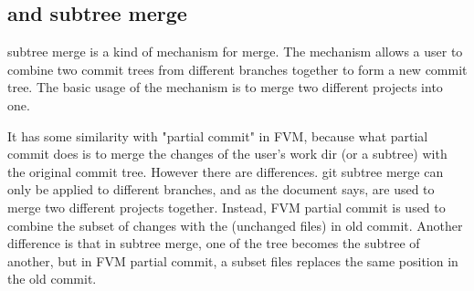 \subsection{\Sys and \git subtree merge}

\Git subtree merge is a kind of mechanism for \git merge.
\cite{git-subtree-merge}
The mechanism allows a user to combine two
commit trees from different branches together to form a new commit tree.
The basic usage of the mechanism is to merge two different projects into one.

It has some similarity with "partial commit" in FVM, because what partial commit
does is to merge the changes of the user's work dir (or a subtree) with the
original commit tree. However there are differences. git subtree merge can only
be applied to different branches, and as the document says, are used to merge
two different projects together. Instead, FVM partial commit is used to combine
the subset of changes with the (unchanged files) in old commit. Another
difference is that in subtree merge, one of the tree becomes the subtree of
another, but in FVM partial commit, a subset files replaces the same position in the old commit.


